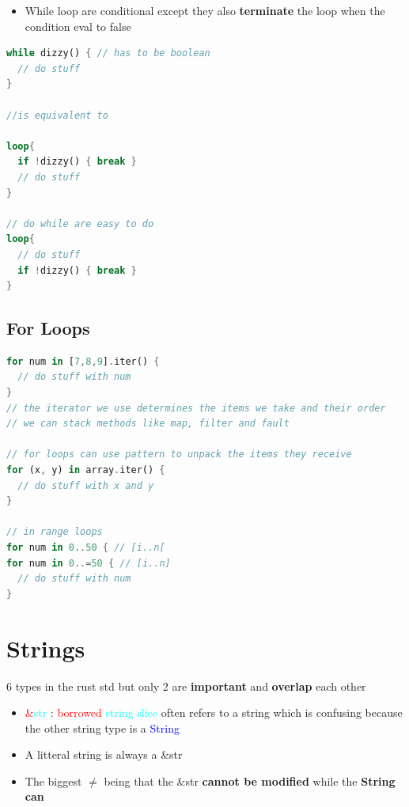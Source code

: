 \documentclass{report}
\begin{document}
\begin{multicols*}{2}
\begin{itemize}
  \item While loop are conditional except they also \textbf{terminate} the loop when the condition eval to false
\end{itemize}

\begin{tcolorbox}[title=While Loops,colback=backcolour,size=small,left=4mm]
\begin{lstlisting}[language=rust]
while dizzy() { // has to be boolean
  // do stuff
}

//is equivalent to  

loop{
  if !dizzy() { break }
  // do stuff
}

// do while are easy to do
loop{
  // do stuff
  if !dizzy() { break }
}
\end{lstlisting}
\end{tcolorbox}

\subsection{For Loops}%
\label{sub:For .. in range}

\begin{tcolorbox}[title=For Loops,colback=backcolour,size=small,left=4mm]
\begin{lstlisting}[language=rust]
for num in [7,8,9].iter() {
  // do stuff with num
}
// the iterator we use determines the items we take and their order 
// we can stack methods like map, filter and fault

// for loops can use pattern to unpack the items they receive
for (x, y) in array.iter() {
  // do stuff with x and y
}

// in range loops
for num in 0..50 { // [i..n[
for num in 0..=50 { // [i..n]
  // do stuff with num
}

\end{lstlisting}
\end{tcolorbox}

\section{Strings}

6 types in the rust std but only 2 are \textbf{important} and \textbf{overlap} each other

\begin{itemize}
  \item \textcolor{red}{\&}\textcolor{cyan}{str} : \textcolor{red}{borrowed} \textcolor{cyan}{string slice} often refers to a string
    which is confusing because the other string type is a \textcolor{blue}{String}  
  \item A litteral string is always a \&str 
  \item The biggest $\neq$ being that the \&str \textbf{cannot be modified} while the \textbf{String can} 
\end{itemize}


\end{multicols*}
\end{document}
